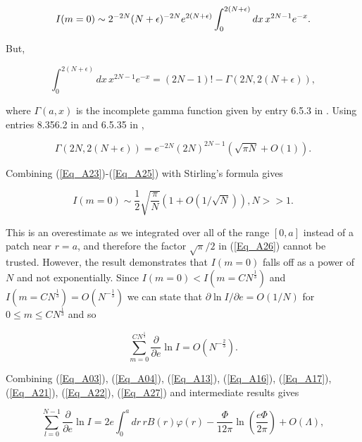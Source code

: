 \documentclass[a4paper,twocolumn,showpacs,preprintnumbers,amsmath,amssymb]{revtex4}
\newcommand{\half}{\frac{1}{2}}
\newcommand{\pdo}[1]{\ensuremath{\frac{\partial }
        {\partial #1 }}}
\begin{document}
\begin{widetext}
\begin{equation}
\label{Eq_A23}
I(m=0) \sim 2^{-2N} (N + \epsilon)^{-2N} e^{2(N+\epsilon)}\\
  \int^{2(N+\epsilon)}_0 dx \, x^{2N-1} e^{-x}.
\end{equation}
\end{widetext}

\noindent
But,

\begin{equation}
\label{Eq_A24}
\int^{2(N+\epsilon)}_0 dx \, x^{2N-1} e^{-x} = (2N-1)!
  - \Gamma(2N,2(N+\epsilon)),
\end{equation}

\noindent
where $\Gamma(a,x)$ is the incomplete gamma function given by entry
6.5.3 in \cite{Abramowitz64}. Using entries 8.356.2 in
\cite{Gradshteyn65} and 6.5.35 in \cite{Abramowitz64},

\begin{equation}
\label{Eq_A25}
\Gamma(2N, 2(N+\epsilon))
  = e^{-2N} (2N)^{2N-1} (\sqrt{\pi N} + O(1)).
\end{equation}

\noindent
Combining (\ref{Eq_A23})-(\ref{Eq_A25}) with Stirling's formula gives

\begin{equation}
\label{Eq_A26}
I(m=0) \sim \half \sqrt{\frac{\pi}{N}} (1 + O(1/\sqrt{N})), N >> 1.
\end{equation}

\noindent
This is an overestimate as we integrated over all of the range $[0,a]$
instead of a patch near $r = a$, and therefore the factor
$\sqrt{\pi}/2$ in (\ref{Eq_A26}) cannot be trusted. However, the
result demonstrates that $I(m=0)$ falls off as a power of $N$ and not
exponentially. Since $I(m=0) < I(m=CN^{\frac{1}{3}})$ and
$I(m=CN^{\frac{1}{3}}) = O(N^{-\frac{1}{3}})$ we can state that
$\partial\ln I / \partial e = O(1/N)$ for
$0 \le m \le CN^{\frac{1}{3}}$ and so


\begin{equation}
\label{Eq_A27}
\sum^{CN^{\frac{1}{3}}}_{m=0} \pdo{e} \ln I = O(N^{-\frac{2}{3}}).
\end{equation}

Combining (\ref{Eq_A03}), (\ref{Eq_A04}), (\ref{Eq_A13}),
(\ref{Eq_A16}), (\ref{Eq_A17}), (\ref{Eq_A21}), (\ref{Eq_A22}),
(\ref{Eq_A27}) and intermediate results gives

\begin{equation}
\label{Eq_A28}
\sum^{N-1}_{l=0} \pdo{e} \ln I
  = 2e \int^{a}_0 dr \, r B(r) \varphi(r)
    - \frac{\Phi}{12\pi} \ln \left(\frac{e\Phi}{2\pi}\right)
    + O(\Lambda),
\end{equation}
\end{document}
